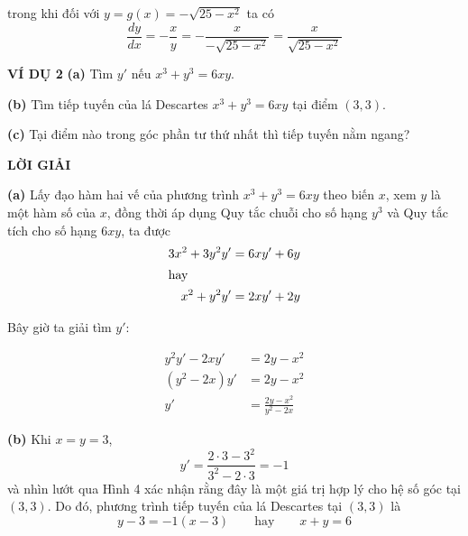 \begin{minipage}[t]{0.70\textwidth}
    \noindent trong khi đối với $y = g(x) = -\sqrt{25 - x^2}$ ta có
    \begin{equation*}
        \frac{dy}{dx} = -\frac{x}{y} = -\frac{x}{-\sqrt{25 - x^2}} = \frac{x}{\sqrt{25 - x^2}}
    \end{equation*}

    \vspace{0.15cm}
    \noindent
    \textbf{\textsf{\color{stewartcyan}VÍ DỤ 2}}\quad
    \textbf{(a)} Tìm $y'$ nếu $x^3 + y^3 = 6xy$.\par
    \noindent
    \textbf{(b)} Tìm tiếp tuyến của lá Descartes $x^3 + y^3 = 6xy$ tại điểm $(3, 3)$.\par
    \noindent
    \textbf{(c)} Tại điểm nào trong góc phần tư thứ nhất thì tiếp tuyến nằm ngang?

    \vspace{0.2cm}
    \noindent
    \textbf{\textsf{\color{stewartcyan}LỜI GIẢI}}\par
    \noindent
    \textbf{(a)} Lấy đạo hàm hai vế của phương trình $x^3 + y^3 = 6xy$ theo biến $x$, xem $y$ là một hàm số của $x$, đồng thời áp dụng Quy tắc chuỗi cho số hạng $y^3$ và Quy tắc tích cho số hạng $6xy$, ta được
    \begin{align*}
        3x^2 + 3y^2y' &= 6xy' + 6y \\
        \shortintertext{hay}
        x^2 + y^2y' &= 2xy' + 2y
    \end{align*}
    \noindent
    \begin{minipage}[t]{0.35\linewidth}
        \vspace{0pt}
        Bây giờ ta giải tìm $y'$:
    \end{minipage}%
    \begin{minipage}[t]{0.65\linewidth}
        \vspace{-1.2\baselineskip}
        \begin{align*}
            y^2y' - 2xy' &= 2y - x^2 \\
            (y^2 - 2x)y' &= 2y - x^2 \\
            y' &= \frac{2y - x^2}{y^2 - 2x}
        \end{align*}
    \end{minipage}

    \vspace{0.1cm}
    \noindent
    \textbf{(b)} Khi $x = y = 3$,
    \begin{equation*}
        y' = \frac{2 \cdot 3 - 3^2}{3^2 - 2 \cdot 3} = -1
    \end{equation*}
    và nhìn lướt qua Hình 4 xác nhận rằng đây là một giá trị hợp lý cho hệ số góc tại $(3, 3)$. Do đó, phương trình tiếp tuyến của lá Descartes tại $(3, 3)$ là
    \begin{equation*}
        y - 3 = -1(x - 3) \qquad\text{hay}\qquad x + y = 6
    \end{equation*}


\end{minipage}

